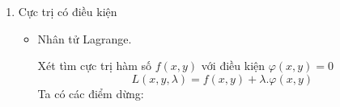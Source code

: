 \documentclass[12pt,a4paper]{report}
\begin{document}
{\begin{center}
\begin{enumerate}
\begin{itemize}
                    Để $M_{0}$ là điểm cực trị của hàm số:

                    Ta xét:
                        \[A = f''_{xx}(x_{0}, y_{0})\]
                        \[B = f''_{xy}(x_{0}, y_{0})\]
                        \[C = f''_{yy}(x_{0}, y_{0})\]
                    \indent Để $M_{0}$ là điểm cực trị của hàm số:
                        \[AC - B^{2} > 0\]
                    Nếu $A > 0$ hoặc $C > 0$ $\Rightarrow$ cực tiểu địa phương.

                    Nếu $A < 0$ hoặc $C < 0$ $\Rightarrow$ cực đại địa phương.
                    
                    Nếu $AC - B^{2} < 0$ $\Rightarrow$ không phải cực trị.

                    Nếu $AC - B^{2} = 0$ $\Rightarrow$ cũng có thể là có, cũng có thể là không.
            
            \end{itemize}
                
        \item Cực trị có điều kiện
            \begin{itemize}
                \item Nhân tử  Lagrange.
                    
                Xét tìm cực trị hàm số $f(x, y)$ với điều kiện $\varphi(x, y) = 0$
                \[L(x, y, \lambda) = f(x, y) + \lambda . \varphi(x, y)\]
                Ta có các điểm dừng:
                
            \end{itemize}
   		
            
    \end{enumerate}
    
\end{center}




}
\end{document}
